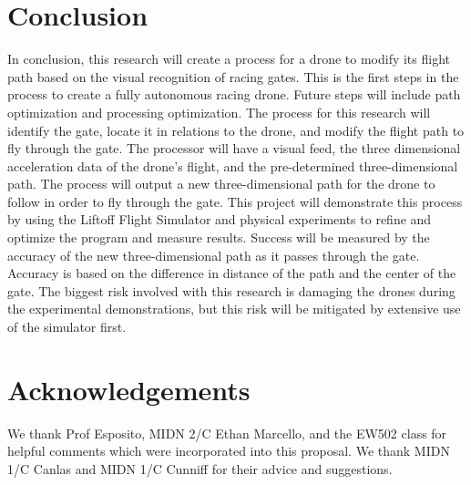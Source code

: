 \documentclass[onecolumn,10pt]{IEEEtran}
\begin{document}
\section{Conclusion}
In conclusion, this research will create a process for a drone to modify its flight path based on the visual recognition of racing gates. This is the first steps in the process to create a fully autonomous racing drone. Future steps will include path optimization and processing optimization. The process for this research will identify the gate, locate it in relations to the drone, and modify the flight path to fly through the gate. The processor will have a visual feed, the three dimensional acceleration data of the drone’s flight, and the pre-determined three-dimensional path. The process will output a new three-dimensional path for the drone to follow in order to fly through the gate. This project will demonstrate this process by using the Liftoff Flight Simulator and physical experiments to refine and optimize the program and measure results. Success will be measured by the accuracy of the new three-dimensional path as it passes through the gate. Accuracy is based on the difference in distance of the path and the center of the gate. The biggest risk involved with this research is damaging the drones during the experimental demonstrations, but this risk will be mitigated by extensive use of the simulator first. 

\section*{Acknowledgements}
We thank Prof Esposito, MIDN 2/C Ethan Marcello, and the EW502 class for helpful comments which were incorporated into this proposal. We thank MIDN 1/C Canlas and MIDN 1/C Cunniff for their advice and suggestions. 
\end{document}
